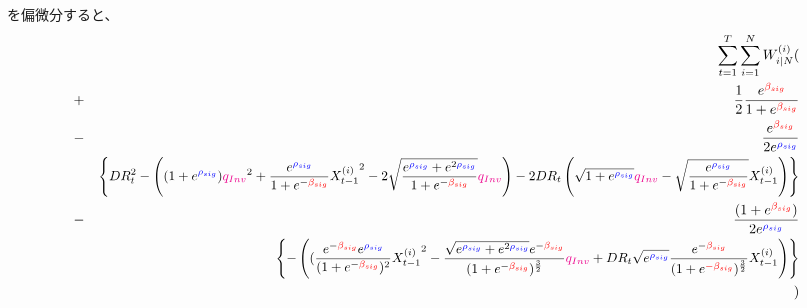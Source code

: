 \documentclass[a4j,11pt]{jarticle}
\begin{document}
を偏微分すると、
\begin{eqnarray}
&&\sum_{t=1}^{T}\sum_{i=1}^{N}W_{i|N}^{(i)}(\nonumber\\
&+&\frac{1}{2}\frac{e^{\textcolor{red}{\beta_{sig}}}}{1+e^{\textcolor{red}{\beta_{sig}}}}\nonumber\\
&-&\frac{e^{\textcolor{red}{\beta_{sig}}}}{2e^{\textcolor{blue}{\rho_{sig}}}}\nonumber\\
&&\scalebox{0.95}{$\displaystyle
\left\{DR_t^2-
\left((1+ e^{\textcolor{blue}{\rho_{sig}}} ) \textcolor{magenta}{q_{Inv}}^2+\frac{e^{\textcolor{blue}{\rho_{sig}}}}{1+e^{-\textcolor{red}{\beta_{sig}}}}{X_{t-1}^{(i)}}^2 - 2 \sqrt{\frac{e^{\textcolor{blue}{\rho_{sig}}} + e^{2\textcolor{blue}{\rho_{sig}}} }{1+e^{-\textcolor{red}{\beta_{sig}}}} }\textcolor{magenta}{q_{Inv}}\right)
 - 2DR_t
\left(\sqrt{1+e^{\textcolor{blue}{\rho_{sig}}}} \textcolor{magenta}{q_{Inv}}-\sqrt{\frac{e^{\textcolor{blue}{\rho_{sig}}}}{1+e^{-\textcolor{red}{\beta_{sig}}}}}X_{t-1}^{(i)}\right)
 \right\}
$}\nonumber\\
&-&\frac{(1+e^{\textcolor{red}{\beta_{sig}}})}{2e^{\textcolor{blue}{\rho_{sig}}}}\nonumber\\
&&
\scalebox{0.95}{$\displaystyle
\left\{-
\left((\frac{e^{-\textcolor{red}{\beta_{sig}}} e^{\textcolor{blue}{\rho_{sig}}}}{(1+e^{-\textcolor{red}{\beta_{sig}}})^2}{X_{t-1}^{(i)}}^2 -  \frac{\sqrt{e^{\textcolor{blue}{\rho_{sig}}} + e^{2\textcolor{blue}{\rho_{sig}}} }e^{-\textcolor{red}{\beta_{sig}}}}{(1+e^{-\textcolor{red}{\beta_{sig}}})^\frac{3}{2} } \textcolor{magenta}{q_{Inv}}
 + DR_t
\sqrt{e^{\textcolor{blue}{\rho_{sig}}} } \frac{e^{-\textcolor{red}{\beta_{sig}}}}{(1+e^{\textcolor{red}{-\beta_{sig}}})^\frac{3}{2}} X_{t-1}^{(i)}\right)
 \right\}
$}\nonumber\\
&&)
\end{eqnarray}
\end{document}
